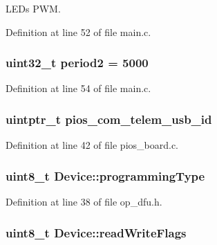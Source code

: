 \-L\-E\-Ds \-P\-W\-M. 



\-Definition at line 52 of file main.\-c.

\hypertarget{group___copter_control_b_l_gadf8633b43922fbf4f1d86981daf74ccc}{
\subsubsection[{period2}]{\setlength{\rightskip}{0pt plus 5cm}uint32\-\_\-t {\bf period2} = 5000}}\label{group___copter_control_b_l_gadf8633b43922fbf4f1d86981daf74ccc}


\-Definition at line 54 of file main.\-c.

\hypertarget{group___copter_control_b_l_ga513cc36d72b76de2fcb75ff233a79a4a}{
\subsubsection[{pios\-\_\-com\-\_\-telem\-\_\-usb\-\_\-id}]{\setlength{\rightskip}{0pt plus 5cm}uintptr\-\_\-t {\bf pios\-\_\-com\-\_\-telem\-\_\-usb\-\_\-id}}}\label{group___copter_control_b_l_ga513cc36d72b76de2fcb75ff233a79a4a}


\-Definition at line 42 of file pios\-\_\-board.\-c.

\hypertarget{group___copter_control_b_l_ga233c334d07cb137f8460511393f09b1f}{
\subsubsection[{programming\-Type}]{\setlength{\rightskip}{0pt plus 5cm}uint8\-\_\-t {\bf \-Device\-::programming\-Type}}}\label{group___copter_control_b_l_ga233c334d07cb137f8460511393f09b1f}


\-Definition at line 38 of file op\-\_\-dfu.\-h.

\hypertarget{group___copter_control_b_l_ga9c191d83ffbfc96da5ddb6bfed066afb}{
\subsubsection[{read\-Write\-Flags}]{\setlength{\rightskip}{0pt plus 5cm}uint8\-\_\-t {\bf \-Device\-::read\-Write\-Flags}}}\label{group___copter_control_b_l_ga9c191d83ffbfc96da5ddb6bfed066afb}


